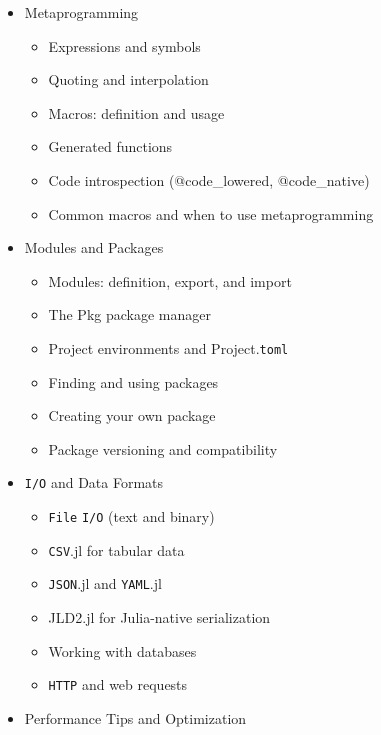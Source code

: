 \documentclass[
]{article}
\providecommand{\tightlist}{%
  \setlength{\itemsep}{0pt}\setlength{\parskip}{0pt}}
\begin{document}
\begin{itemize}
  \begin{itemize}
  \tightlist
  \item
    \texttt{Array} creation and initialization
  \item
    Indexing, slicing, and views
  \item
    Broadcasting
  \item
    Comprehensions and generators
  \item
    Matrix operations and linear algebra
  \item
    Sparse arrays
  \item
    The LinearAlgebra standard library
  \end{itemize}
\item
  Metaprogramming

  \begin{itemize}
  \tightlist
  \item
    Expressions and symbols
  \item
    Quoting and interpolation
  \item
    Macros: definition and usage
  \item
    Generated functions
  \item
    Code introspection (@code\_lowered, @code\_native)
  \item
    Common macros and when to use metaprogramming
  \end{itemize}
\item
  Modules and Packages

  \begin{itemize}
  \tightlist
  \item
    Modules: definition, export, and import
  \item
    The Pkg package manager
  \item
    Project environments and Project.\texttt{toml}
  \item
    Finding and using packages
  \item
    Creating your own package
  \item
    Package versioning and compatibility
  \end{itemize}
\item
  \texttt{I/O} and Data Formats

  \begin{itemize}
  \tightlist
  \item
    \texttt{File} \texttt{I/O} (text and binary)
  \item
    \texttt{CSV}.jl for tabular data
  \item
    \texttt{JSON}.jl and \texttt{YAML}.jl
  \item
    JLD2.jl for Julia-native serialization
  \item
    Working with databases
  \item
    \texttt{HTTP} and web requests
  \end{itemize}
\item
  Performance Tips and Optimization


\end{itemize}
\end{document}
